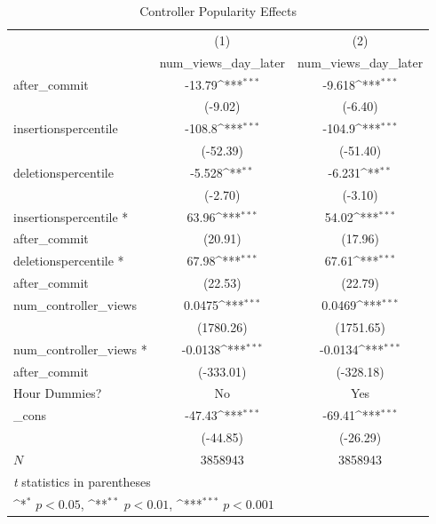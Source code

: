 \documentclass[12pt]{article}
\begin{document}
\begin{table}[h!]
\centering
\caption{Controller Popularity Effects}
{
    \def\sym#1{\ifmmode^{#1}\else\(^{#1}\)\fi}
    \begin{tabular}{l*{2}{c}}
    \hline\hline
        &\multicolumn{1}{c}{(1)}&\multicolumn{1}{c}{(2)}\\
        &\multicolumn{1}{c}{num\_views\_day\_later}&\multicolumn{1}{c}{num\_views\_day\_later}\\
        \hline
        after\_commit&      -13.79\sym{***}&      -9.618\sym{***}\\
        &     (-9.02)         &     (-6.40)         \\
        [0.5em]
        insertionspercentile&      -108.8\sym{***}&      -104.9\sym{***}\\
        &    (-52.39)         &    (-51.40)         \\
        [0.5em]
        deletionspercentile&      -5.528\sym{**} &      -6.231\sym{**} \\
        &     (-2.70)         &     (-3.10)         \\
        [0.5em]
        insertionspercentile *&       63.96\sym{***}&       54.02\sym{***}\\
        after\_commit &     (20.91)         &     (17.96)         \\
        [0.5em]
        deletionspercentile *&       67.98\sym{***}&       67.61\sym{***}\\
        after\_commit&     (22.53)         &     (22.79)         \\
        [0.5em]
        num\_controller\_views&      0.0475\sym{***}&      0.0469\sym{***}\\
        &   (1780.26)         &   (1751.65)         \\
        [0.5em]
        num\_controller\_views *&     -0.0138\sym{***}&     -0.0134\sym{***}\\
        after\_commit&   (-333.01)         &   (-328.18)         \\
        [0.5em]
        Hour Dummies?  &      No               &    Yes        \\
        [0.5em]
        \_cons      &      -47.43\sym{***}&      -69.41\sym{***}\\
        &    (-44.85)         &    (-26.29)         \\
        \hline
        \(N\)       &     3858943         &     3858943         \\
        \hline\hline
        \multicolumn{3}{l}{\footnotesize \textit{t} statistics in parentheses}\\
        \multicolumn{3}{l}{\footnotesize \sym{*} \(p<0.05\), \sym{**} \(p<0.01\), \sym{***} \(p<0.001\)}\\
        \end{tabular}
}
\label{table:full-controller-micro}
\end{table}
\end{document}
